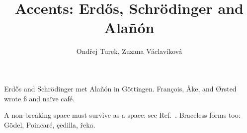 \documentclass{article}
\title{Accents: Erd\H{o}s, Schr\"{o}dinger and Ala\~{n}\'{o}n}
\author{Ond\v{r}ej Turek, Zuzana V\'{a}clav\'{i}kov\'{a}}
\begin{document}
\maketitle

Erd\H{o}s and Schr\"{o}dinger met Ala\~{n}\'{o}n in G\"ottingen.
Fran\c{c}ois, \AA ke, and \O rsted wrote \ss{} and na\"ive caf\'e.

A non-breaking space must survive as a space: see Ref.~\cite{schrod}.
Braceless forms too: G\"odel, Poincar\'e, \c cedilla, \v{r}eka.


\end{document}
